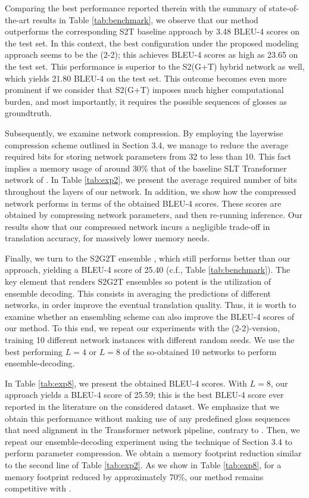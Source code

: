 \documentclass[10pt,twocolumn,letterpaper]{article}
\begin{document}
Comparing the best performance reported therein with the summary of state-of-the-art results in Table \ref{tab:benchmark}, we observe that our method outperforms the corresponding S2T baseline approach by 3.48 BLEU-4 scores on the test set. In this context, the best configuration under the proposed modeling approach seems to be the (2-2); this achieves BLEU-4 scores as high as 23.65 on the test set. This performance is superior to the S2(G+T) hybrid network as well, which yields 21.80 BLEU-4 on the test set. This outcome becomes even more prominent if we consider that S2(G+T) imposes much higher computational burden, and most importantly, it requires the possible sequences of glosses as groundtruth.

Subsequently, we examine network compression. By employing the layerwise compression scheme outlined in Section 3.4, we manage to reduce the average required bits for storing network parameters from 32 to less than 10. This fact implies a memory usage of around 30\% that of the baseline SLT Transformer network of \cite{Camgoz20}. In Table \ref{tab:exp2}, we present the average required number of bits throughout the layers of our network. In addition, we show how the compressed network performs in terms of the obtained BLEU-4 scores. These scores are obtained by compressing network parameters, and then re-running inference. Our results show that our compressed network incurs a negligible trade-off in translation accuracy, for massively lower memory needs.

Finally, we turn to the S2G2T ensemble \cite{yin2020}, which still performs better than our approach, yielding a BLEU-4 score of 25.40 (c.f., Table \ref{tab:benchmark}). The key element that renders S2G2T ensembles so potent is the utilization of ensemble decoding. This consists in averaging the predictions of different networks, in order improve the eventual translation quality. Thus, it is worth to examine whether an ensembling scheme can also improve the BLEU-4 scores of our method. To this end, we repeat our experiments with the (2-2)-version, training 10 different network instances with different random seeds. We use the best performing $L=4$ or $L=8$ of the so-obtained 10 networks to perform ensemble-decoding. 

In Table \ref{tab:exp8}, we present the obtained BLEU-4 scores. With $L=8$, our approach yields a BLEU-4 score of 25.59; this is the best BLEU-4 score ever reported in the literature on the considered dataset. We emphasize that we obtain this performance without making use of any predefined gloss sequences that need alignment in the Transformer network pipeline, contrary to \cite{yin2020}. Then, we repeat our ensemble-decoding experiment using the technique of Section 3.4 to perform parameter compression. We obtain a memory footprint reduction similar to the second line of Table \ref{tab:exp2}. As we show in Table \ref{tab:exp8}, for a memory footprint reduced by approximately 70\%, our method remains competitive with \cite{yin2020}.
\end{document}
